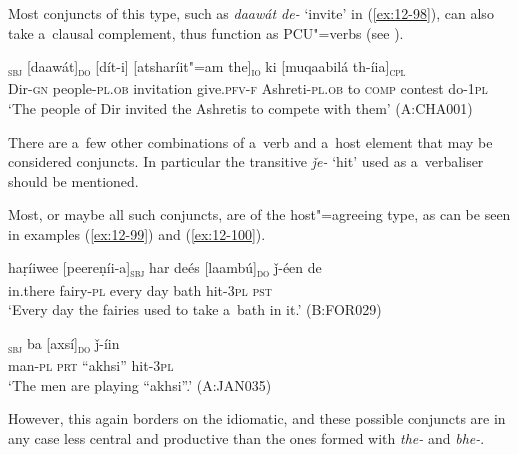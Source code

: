 Most conjuncts of this type, such as \textit{daawát de-} `invite' in (\ref{ex:12-98}), can also take a~clausal complement, thus function as PCU"=verbs (see ).

\begin{exe}
\ex
\label{ex:12-98}
\gll [deewúl-ii xálak"=am]\textsubscript{\textsc{sbj}} [daawát]\textsubscript{\textsc{do}} [dít-i] [atsharíit"=am the]\textsubscript{\textsc{io}} ki [muqaabilá th-íia]\textsubscript{\textsc{cpl}}  \\
Dir-\textsc{gn} people-\textsc{pl.ob} invitation give.\textsc{pfv-f}  Ashreti-\textsc{pl.ob} to \textsc{comp} contest do-\textsc{1pl} \\
\glt `The people of Dir invited the Ashretis to compete with them' (A:CHA001)
\end{exe}

 There are a~few other combinations of a~verb and a~host element that may be considered conjuncts. In particular the transitive \textit{ǰe-} `hit' used as a~verbaliser should be mentioned.


Most, or maybe all such conjuncts, are of the host"=agreeing type, as can be seen in examples (\ref{ex:12-99}) and (\ref{ex:12-100}). 

\begin{exe}
\ex
\label{ex:12-99}
\gll haṛíiwee [peereṇíi-a]\textsubscript{\textsc{sbj}} har deés [laambú]\textsubscript{\textsc{do}} ǰ-éen de \\
in.there fairy-\textsc{pl} every day bath hit-\textsc{3pl} \textsc{pst} \\
\glt `Every day the fairies used to take a~bath in it.' (B:FOR029)
\end{exe}
\begin{exe}
\ex
\label{ex:12-100}
\gll [míiš-a]\textsubscript{\textsc{sbj}} ba [axsí]\textsubscript{\textsc{do}} ǰ-íin  \\
man-\textsc{pl} \textsc{prt} ``akhsi'' hit-\textsc{3pl} \\
\glt `The men are playing ``akhsi''.' (A:JAN035)
\end{exe}

However, this again borders on the idiomatic, and these possible conjuncts are in any case less central and productive than the ones formed with \textit{the-} and \textit{bhe-}.